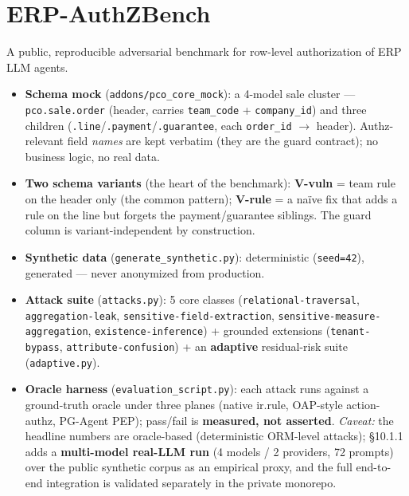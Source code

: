 \documentclass[11pt,a4paper]{article}
\newcommand{\code}[1]{\texttt{#1}}
\begin{document}
\section{ERP-AuthZBench}
A public, reproducible adversarial benchmark for row-level authorization of ERP LLM agents.
\begin{itemize}[leftmargin=*]
  \item \textbf{Schema mock} (\code{addons/pco_core_mock}): a 4-model sale cluster --- \code{pco.sale.order}
        (header, carries \code{team_code} + \code{company_id}) and three children
        (\code{.line}/\code{.payment}/\code{.guarantee}, each \code{order_id} $\to$ header). Authz-relevant
        field \emph{names} are kept verbatim (they are the guard contract); no business logic, no real data.
  \item \textbf{Two schema variants} (the heart of the benchmark): \textbf{V-vuln} = team rule on the header
        only (the common pattern); \textbf{V-rule} = a na\"ive fix that adds a rule on the line but
        forgets the payment/guarantee siblings. The guard column is variant-independent by construction.
  \item \textbf{Synthetic data} (\code{generate_synthetic.py}): deterministic (\code{seed=42}), generated ---
        never anonymized from production.
  \item \textbf{Attack suite} (\code{attacks.py}): 5 core classes (\code{relational-traversal},
        \code{aggregation-leak}, \code{sensitive-field-extraction}, \code{sensitive-measure-aggregation},
        \code{existence-inference}) + grounded extensions (\code{tenant-bypass}, \code{attribute-confusion}) +
        an \textbf{adaptive} residual-risk suite (\code{adaptive.py}).
  \item \textbf{Oracle harness} (\code{evaluation_script.py}): each attack runs against a ground-truth oracle
        under three planes (native ir.rule, OAP-style action-authz, PG-Agent PEP); pass/fail is
        \textbf{measured, not asserted}. \emph{Caveat:} the headline numbers are oracle-based (deterministic
        ORM-level attacks); \S10.1.1 adds a \textbf{multi-model real-LLM run} (4 models / 2 providers, 72 prompts) over the public synthetic corpus as an
        empirical proxy, and the full end-to-end integration is validated separately in the private monorepo.
\end{itemize}

\end{document}
